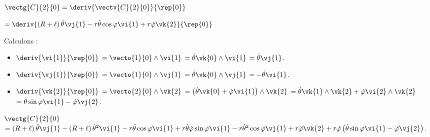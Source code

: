 \ifprof ~\\
 
 $\vectg{C}{2}{0} = \deriv{\vectv{C}{2}{0}}{\rep{0}}$
 
 $ = \deriv{\left(R+\ell\right)\dot{\theta}\vj{1} -r\dot{\theta}\cos\varphi \vi{1} + r\dot{\varphi}\vk{2}}{\rep{0}}$
 
 Calculons : 
\begin{itemize}
\item $\deriv{\vi{1}}{\rep{0}}$ $=\vecto{1}{0} \wedge \vi{1}$ $=\dot{\theta}\vk{0} \wedge \vi{1}$ $=\dot{\theta}\vj{1}$.
\item $\deriv{\vj{1}}{\rep{0}}$ $=\vecto{1}{0} \wedge \vj{1}$ $=\dot{\theta}\vk{0} \wedge \vj{1}$ $=-\dot{\theta}\vi{1}$.
\item $\deriv{\vk{2}}{\rep{0}}$ $=\vecto{2}{0} \wedge \vk{2}$ 
$=\left(\dot{\theta}\vk{0}+ \dot{\varphi}\vi{1} \right) \wedge \vk{2}$
$=\dot{\theta}\vk{1} \wedge \vk{2}+ \dot{\varphi}\vi{2}  \wedge \vk{2}$
$=\dot{\theta}\sin\varphi\vi{1}- \dot{\varphi}\vj{2}$.
\end{itemize}

$\vectg{C}{2}{0}$ 
$ =\left(R+\ell\right)\ddot{\theta}\vj{1} -\left(R+\ell\right)\dot{\theta}^2\vi{1} 
-r\ddot{\theta}\cos\varphi \vi{1} +r\dot{\theta}\dot{\varphi}\sin\varphi \vi{1} -r\dot{\theta}^2\cos\varphi \vj{1} 
+ r\ddot{\varphi}\vk{2}+ r\dot{\varphi}\left(\dot{\theta}\sin\varphi\vi{1}- \dot{\varphi}\vj{2} \right)$.
\else
\fi

